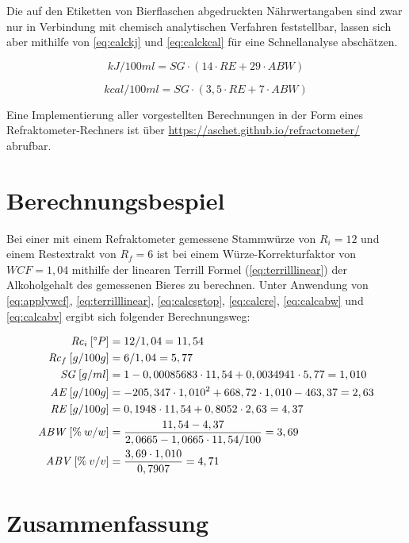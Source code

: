 \documentclass[a4paper,parskip=half]{scrartcl}
\newcommand{\bxi}{\mathit{R}_i}
\newcommand{\bxic}{\mathit{Rc}_i}
\newcommand{\bxf}{\mathit{R}_f}
\newcommand{\bxfc}{\mathit{Rc}_f}
\newcommand{\sg}{\mathit{SG}}
\newcommand{\abv}{\mathit{ABV}}
\newcommand{\abw}{\mathit{ABW}}
\newcommand{\aex}{\mathit{AE}}
\newcommand{\rex}{\mathit{RE}}
\newcommand{\wcf}{\mathit{WCF}}
\begin{document}
Die auf den Etiketten von Bierflaschen abgedruckten Nährwertangaben sind
zwar nur in Verbindung mit chemisch analytischen Verfahren feststellbar,
lassen sich aber mithilfe von \autoref{eq:calckj} und \autoref{eq:calckcal}
für eine Schnellanalyse abschätzen. \parencite[161]{MEBAK2013} 

\begin{equation}
kJ/100ml = \sg \cdot (14 \cdot \rex + 29 \cdot \abw)
\label{eq:calckj}
\end{equation}

\begin{equation}
kcal/100ml = \sg \cdot (3,5 \cdot \rex + 7 \cdot \abw)
\label{eq:calckcal}
\end{equation}

Eine Implementierung aller vorgestellten Berechnungen in der Form eines
Refraktometer-Rechners ist über \url{https://aschet.github.io/refractometer/}
abrufbar.

\section*{Berechnungsbespiel}

Bei einer mit einem Refraktometer gemessene Stammwürze von $\bxi = 12$
und einem Restextrakt von $\bxf = 6$ ist bei einem Würze-Korrekturfaktor
von $\wcf = 1,04$ mithilfe der linearen Terrill Formel
(\autoref{eq:terrilllinear}) der Alkoholgehalt des gemessenen Bieres
zu berechnen. Unter Anwendung von \autoref{eq:applywcf},
\autoref{eq:terrilllinear}, \autoref{eq:calcsgtop},
\autoref{eq:calcre}, \autoref{eq:calcabw} und \autoref{eq:calcabv} ergibt
sich folgender Berechnungsweg:

\begin{align*}
\bxic\:[\degree P] &= 12 / 1,04 = 11,54 \\
\bxfc\:[g/100g] &= 6 / 1,04 = 5,77 \\
\sg\:[g/ml] &= 1 - 0,00085683 \cdot 11,54 + 0,0034941 \cdot 5,77 = 1,010 \\
\aex\:[g/100g] &= -205,347 \cdot 1,010^2 + 668,72 \cdot 1,010 - 463,37 = 2,63 \\
\rex\:[g/100g] &= 0,1948 \cdot 11,54 + 0,8052 \cdot 2,63 = 4,37 \\
\abw\:[\%\:w/w] &= \frac{11,54 - 4,37}{2,0665 - 1,0665 \cdot 11,54 / 100} = 3,69 \\
\abv\:[\%\:v/v] &= \frac{3,69 \cdot 1,010}{0,7907} = 4,71
\end{align*}

\section*{Zusammenfassung}
\end{document}
